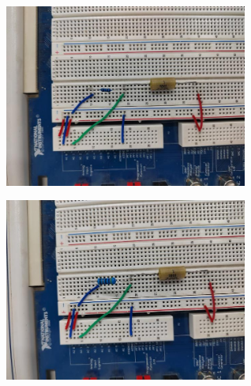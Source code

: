 \documentclass[UTF8]{article}
\theoremstyle{MyLineTheoremStyle} %
\theoremstyle{MyBlockTheoremStyle} %
\theoremstyle{MySubsubsectionStyle} %
\begin{document}
\begin{figure}[H]\centering
    \begin{subfigure}[b]{0.5\columnwidth}\centering
        \includegraphics[height=170pt]{assets/附录/IMG_20241015_164039.jpg}
    \end{subfigure}\hfill
    \begin{subfigure}[b]{0.5\columnwidth}\centering
        \includegraphics[height=170pt]{assets/附录/IMG_20241015_164436.jpg}
    \end{subfigure}
\end{figure}
\end{document}
